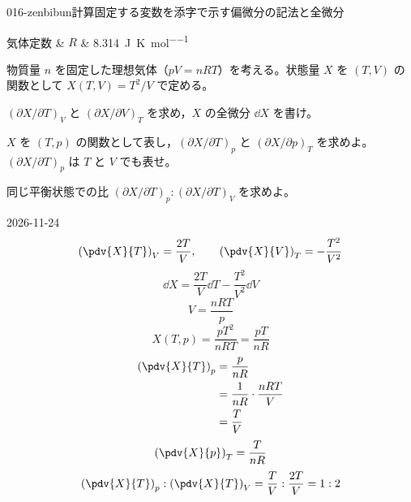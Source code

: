 \documentclass[uplatex,dvipdfmx,a4paper,11pt]{jsarticle}
\begin{document}
\mondaihen
{}
\begin{mondai}{016-zenbibun}{計算}{固定する変数を添字で示す偏微分の記法と全微分}
\begin{teisuu}
  気体定数 & $R$ & \qty{8.314}{\joule\per\kelvin\per\mole}\\
\end{teisuu}
物質量 $n$ を固定した理想気体（$pV = nRT$）を考える。状態量 $X$ を $(T,V)$ の関数として $X(T,V) = T^{2}/V$ で定める。
  \begin{shoumon}
    \item $(\partial X/\partial T)_{V}$ と $(\partial X/\partial V)_{T}$ を求め，$X$ の全微分 $\dd X$ を書け。
    \item $X$ を $(T,p)$ の関数として表し，$(\partial X/\partial T)_{p}$ と $(\partial X/\partial p)_{T}$ を求めよ。$(\partial X/\partial T)_{p}$ は $T$ と $V$ でも表せ。
    \item 同じ平衡状態での比 $(\partial X/\partial T)_{p} : (\partial X/\partial T)_{V}$ を求めよ。
  \end{shoumon}
\begin{kotaeutsushi}{2026-11-24}
\[ \left(\pdv{X}{T}\right)_{V}=\frac{2T}{V}, \qquad \left(\pdv{X}{V}\right)_{T}=-\frac{T^{2}}{V^{2}} \]
\[ \dd X=\frac{2T}{V}\dd T-\frac{T^{2}}{V^{2}}\dd V \]
\[ V=\frac{nRT}{p} \]
\[ X(T,p)=\frac{pT^{2}}{nRT}=\frac{pT}{nR} \]
\begin{align*}
\left(\pdv{X}{T}\right)_{p}&=\frac{p}{nR}\\
&=\frac{1}{nR}\cdot\frac{nRT}{V}\\
&=\frac{T}{V}
\end{align*}
\[ \left(\pdv{X}{p}\right)_{T}=\frac{T}{nR} \]
\[ \left(\pdv{X}{T}\right)_{p}:\left(\pdv{X}{T}\right)_{V}=\frac{T}{V}:\frac{2T}{V}=1:2 \]
\end{kotaeutsushi}
\end{mondai}
\end{document}
